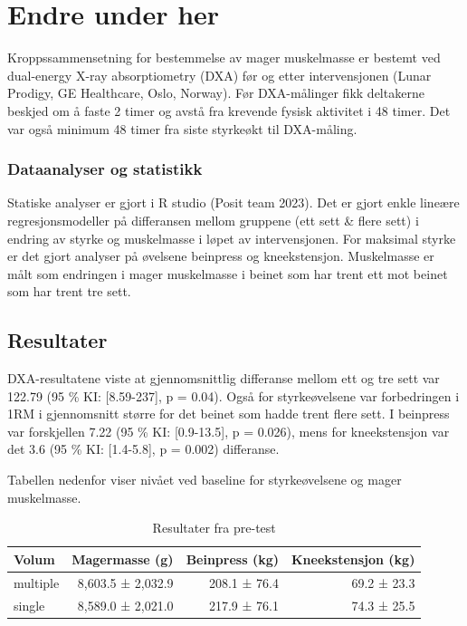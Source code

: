 \documentclass[
  letterpaper,
  DIV=11,
  numbers=noendperiod]{scrreprt}
\begin{document}

\chapter{Endre under her}\label{endre-under-her}

Kroppssammensetning for bestemmelse av mager muskelmasse er bestemt ved
dual-energy X-ray absorptiometry (DXA) før og etter intervensjonen
(Lunar Prodigy, GE Healthcare, Oslo, Norway). Før DXA-målinger fikk
deltakerne beskjed om å faste 2 timer og avstå fra krevende fysisk
aktivitet i 48 timer. Det var også minimum 48 timer fra siste styrkeøkt
til DXA-måling.

\subsection{Dataanalyser og
statistikk}\label{dataanalyser-og-statistikk}

Statiske analyser er gjort i R studio (Posit team 2023). Det er gjort
enkle lineære regresjonsmodeller på differansen mellom gruppene (ett
sett \& flere sett) i endring av styrke og muskelmasse i løpet av
intervensjonen. For maksimal styrke er det gjort analyser på øvelsene
beinpress og kneekstensjon. Muskelmasse er målt som endringen i mager
muskelmasse i beinet som har trent ett mot beinet som har trent tre
sett.

\section{Resultater}\label{resultater}

DXA-resultatene viste at gjennomsnittlig differanse mellom ett og tre
sett var 122.79 (95 \% KI: {[}8.59-237{]}, p = 0.04). Også for
styrkeøvelsene var forbedringen i 1RM i gjennomsnitt større for det
beinet som hadde trent flere sett. I beinpress var forskjellen 7.22 (95
\% KI: {[}0.9-13.5{]}, p = 0.026), mens for kneekstensjon var det 3.6
(95 \% KI: {[}1.4-5.8{]}, p = 0.002) differanse.

Tabellen nedenfor viser nivået ved baseline for styrkeøvelsene og mager
muskelmasse.

\begingroup
\fontsize{12.0pt}{14.4pt}\selectfont
\setlength{\LTpost}{0mm}

\begin{longtable}{lrrr}

\caption{\label{tbl-pre}Resultater fra pre-test}

\tabularnewline

\toprule
Volum & Magermasse (g) & Beinpress (kg) & Kneekstensjon (kg) \\ 
\midrule\addlinespace[2.5pt]
multiple & 8,603.5 ± 2,032.9 & 208.1 ± 76.4 & 69.2 ± 23.3 \\ 
single & 8,589.0 ± 2,021.0 & 217.9 ± 76.1 & 74.3 ± 25.5 \\ 
\bottomrule

\end{longtable}
\end{document}
